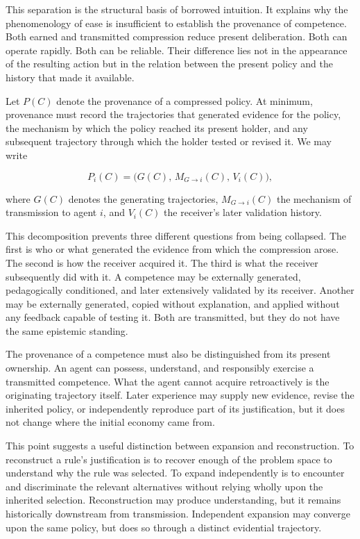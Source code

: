 \documentclass[11pt]{article}
\begin{document}
This separation is the structural basis of borrowed intuition. It explains why the phenomenology of ease is insufficient to establish the provenance of competence. Both earned and transmitted compression reduce present deliberation. Both can operate rapidly. Both can be reliable. Their difference lies not in the appearance of the resulting action but in the relation between the present policy and the history that made it available.

Let $P(C)$ denote the provenance of a compressed policy. At minimum, provenance must record the trajectories that generated evidence for the policy, the mechanism by which the policy reached its present holder, and any subsequent trajectory through which the holder tested or revised it. We may write

\[
P_i(C)
=
\bigl(
G(C),\,M_{G \to i}(C),\,V_i(C)
\bigr),
\]

where $G(C)$ denotes the generating trajectories, $M_{G \to i}(C)$ the mechanism of transmission to agent $i$, and $V_i(C)$ the receiver's later validation history.

This decomposition prevents three different questions from being collapsed. The first is who or what generated the evidence from which the compression arose. The second is how the receiver acquired it. The third is what the receiver subsequently did with it. A competence may be externally generated, pedagogically conditioned, and later extensively validated by its receiver. Another may be externally generated, copied without explanation, and applied without any feedback capable of testing it. Both are transmitted, but they do not have the same epistemic standing.

The provenance of a competence must also be distinguished from its present ownership. An agent can possess, understand, and responsibly exercise a transmitted competence. What the agent cannot acquire retroactively is the originating trajectory itself. Later experience may supply new evidence, revise the inherited policy, or independently reproduce part of its justification, but it does not change where the initial economy came from.

This point suggests a useful distinction between expansion and reconstruction. To reconstruct a rule's justification is to recover enough of the problem space to understand why the rule was selected. To expand independently is to encounter and discriminate the relevant alternatives without relying wholly upon the inherited selection. Reconstruction may produce understanding, but it remains historically downstream from transmission. Independent expansion may converge upon the same policy, but does so through a distinct evidential trajectory.
\end{document}
